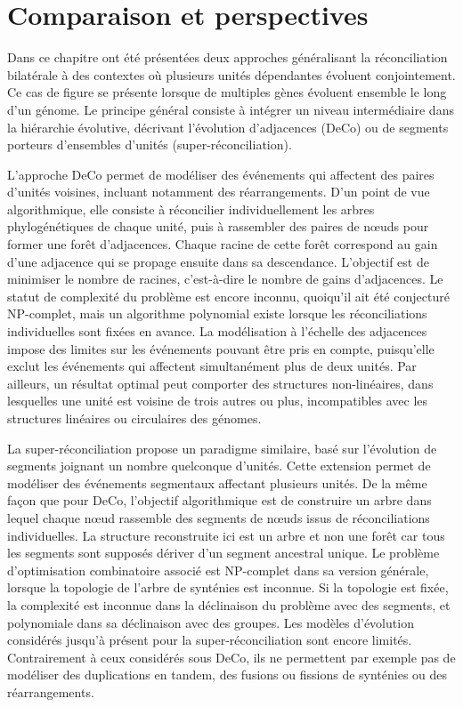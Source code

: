 \section{Comparaison et perspectives}

Dans ce chapitre ont été présentées deux approches généralisant la réconciliation bilatérale à des contextes où plusieurs unités dépendantes évoluent conjointement.
Ce cas de figure se présente lorsque de multiples gènes évoluent ensemble le long d’un génome.
Le principe général consiste à intégrer un niveau intermédiaire dans la hiérarchie évolutive, décrivant l’évolution d’adjacences (DeCo) ou de segments porteurs d’ensembles d’unités (super-réconciliation).

L’approche DeCo permet de modéliser des événements qui affectent des paires d’unités voisines, incluant notamment des réarrangements.
D’un point de vue algorithmique, elle consiste à réconcilier individuellement les arbres phylogénétiques de chaque unité, puis à rassembler des paires de nœuds pour former une forêt d’adjacences.
Chaque racine de cette forêt correspond au gain d’une adjacence qui se propage ensuite dans sa descendance.
L’objectif est de minimiser le nombre de racines, c’est-à-dire le nombre de gains d’adjacences.
Le statut de complexité du problème est encore inconnu, quoiqu’il ait été conjecturé NP-complet, mais un algorithme polynomial existe lorsque les réconciliations individuelles sont fixées en avance.
La modélisation à l’échelle des adjacences impose des limites sur les événements pouvant être pris en compte, puisqu’elle exclut les événements qui affectent simultanément plus de deux unités.
Par ailleurs, un résultat optimal peut comporter des structures non-linéaires, dans lesquelles une unité est voisine de trois autres ou plus, incompatibles avec les structures linéaires ou circulaires des génomes.

La super-réconciliation propose un paradigme similaire, basé sur l’évolution de segments joignant un nombre quelconque d’unités.
Cette extension permet de modéliser des événements segmentaux affectant plusieurs unités.
De la même façon que pour DeCo, l’objectif algorithmique est de construire un arbre dans lequel chaque nœud rassemble des segments de nœuds issus de réconciliations individuelles.
La structure reconstruite ici est un arbre et non une forêt car tous les segments sont supposés dériver d’un segment ancestral unique.
Le problème d’optimisation combinatoire associé est NP-complet dans sa version générale, lorsque la topologie de l’arbre de synténies est inconnue.
Si la topologie est fixée, la complexité est inconnue dans la déclinaison du problème avec des segments, et polynomiale dans sa déclinaison avec des groupes.
Les modèles d’évolution considérés jusqu’à présent pour la super-réconciliation sont encore limités.
Contrairement à ceux considérés sous DeCo, ils ne permettent par exemple pas de modéliser des duplications en tandem, des fusions ou fissions de synténies ou des réarrangements.
